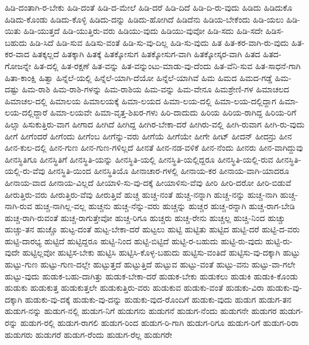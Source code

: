 {ಹಿಡಿ-ದಂತಾಗಿ-ರ-ಬೇಕು
ಹಿಡಿ-ದಂತೆ
ಹಿಡಿ-ದ-ಮೇಲೆ
ಹಿಡಿ-ದರೆ
ಹಿಡಿ-ದಿದೆ
ಹಿಡಿ-ದಿ-ರು-ವುದು
ಹಿಡಿದು
ಹಿಡಿದುಕೊ
ಹಿಡಿದು-ಕೊಂಡು
ಹಿಡಿದು-ಕೊಳ್ಳಿ
ಹಿಡಿದು-ದನ್ನು
ಹಿಡಿದು-ಹೋಗಿದೆ
ಹಿಡಿದೆನು
ಹಿಡಿಯ-ಬೇಕೆಂದು
ಹಿಡಿ-ಯಲು
ಹಿಡಿ-ಯಿತು
ಹಿಡಿ-ಯುತ್ತದೆ
ಹಿಡಿ-ಯುತ್ತಿರು-ವರು
ಹಿಡಿಯು-ವುದು
ಹಿಡಿಯು-ವುವೋ
ಹಿಡಿ-ಸದು
ಹಿಡಿ-ಸದೇ
ಹಿಡಿಸ-ಬಹುದು
ಹಿಡಿ-ಸಿದೆ
ಹಿಡಿ-ಸುವ
ಹಿಡಿಸು-ವಂತೆ
ಹಿಡಿ-ಸು-ವು-ದಿಲ್ಲ
ಹಿಡಿ-ಸು-ವುದು
ಹಿತ
ಹಿತ-ಕರ-ವಾಗಿ-ರು-ವುದು
ಹಿತ-ಕರ-ವಾದ
ಹಿತಕ್ಕಲ್ಲದೆ
ಹಿತಕ್ಕಾಗಿ
ಹಿತಕ್ಕೆ
ಹಿತಕ್ಕೋಸುಗ
ಹಿತಕ್ಕೋಸುಗ-ವಾಗಿ
ಹಿತಕ್ಕೋಸ್ಕರ-ವಾಗಿ
ಹಿತದ
ಹಿತದ-ಗೋಜನ್ನೇ
ಹಿತ-ದಲ್ಲಿ
ಹಿತ-ರಕ್ಷಣೆ
ಹಿತ-ವನ್ನು
ಹಿತ-ವನ್ನುಂಟು-ಮಾಡು-ವು-ದೆಂದು
ಹಿತ-ವೆನಿ-ಸುವ
ಹಿತ-ಸಾಧನೆ-ಗಾಗಿ
ಹಿತಾ-ಕಾಂಕ್ಷಿ
ಹಿತ್ವಾ
ಹಿನ್ನೆಲೆ-ಯಲ್ಲಿ
ಹಿನ್ನೆಲೆ-ಯಾಗಿ-ದೆಯೋ
ಹಿನ್ನೆಲೆ-ಯಾಗಿವೆ
ಹಿಮ
ಹಿಮದ
ಹಿಮದ-ಗಡ್ಡೆ
ಹಿಮ-ದಷ್ಟು
ಹಿಮ-ರಾಶಿ
ಹಿಮ-ರಾಶಿ-ಗಳನ್ನು
ಹಿಮ-ರಾಶಿಯ
ಹಿಮ-ವನ್ನು
ಹಿಮ-ವೇನೂ
ಹಿಮಶ್ರೇಣಿ-ಗಳ
ಹಿಮಾಚಲದ
ಹಿಮಾಚಲ-ದಲ್ಲಿ
ಹಿಮಾಲಯ
ಹಿಮಾಲಯಕ್ಕೆ
ಹಿಮಾ-ಲಯದ
ಹಿಮಾ-ಲಯ-ದಲ್ಲಿ
ಹಿಮಾ-ಲಯ-ದಲ್ಲಿದ್ದಾಗ
ಹಿಮಾ-ಲಯ-ದಲ್ಲಿದ್ದಾರೆ
ಹಿಮಾ-ಲಯವೇ
ಹಿಮಾ-ವೃತ್ತ-ಶಿಖರ-ಗಳು
ಹಿರಿ-ದಾದುದು
ಹಿರಿಯ
ಹಿರಿಯ-ರಾಗಿದ್ದ
ಹಿರಿಯ-ರಿಗೆ
ಹಿಲ್ಸಾ
ಹಿಸುಕುತ್ತಿರು-ವಾಗ
ಹೀಗಾದ
ಹೀಗಿದೆ
ಹೀಗಿದ್ದ
ಹೀಗಿರ-ಬೇಕಾ-ದರೆ
ಹೀಗಿರು-ವಲ್ಲಿ
ಹೀಗಿ-ರುವಾಗ
ಹೀಗಿ-ರು-ವುದು
ಹೀಗೆ
ಹೀಗೆಂದರೆ
ಹೀಗೆಂದು
ಹೀಗೆಂಬ
ಹೀಗೆನ್ನು-ವರು
ಹೀಗೆಯೆ
ಹೀಗೆಯೇ
ಹೀಗೇ
ಹೀಟ್
ಹೀದನ್
ಹೀದನ್ರು
ಹೀನ
ಹೀನ-ಕುಲ-ದಲ್ಲಿ
ಹೀನ-ಗುಣ
ಹೀನ-ಗುಣ-ಗಳಿಲ್ಲದೆ
ಹೀನತೆ
ಹೀನ-ನಡ-ವಳಿಕೆ
ಹೀನ-ನೆಂದು
ಹೀನರು
ಹೀನ-ವಾಗಿದ್ದುವು
ಹೀನಸ್ಥಿತಿಗೂ
ಹೀನಸ್ಥಿತಿಗೆ
ಹೀನಸ್ಥಿತಿ-ಯನ್ನು
ಹೀನಸ್ಥಿತಿ-ಯಲ್ಲಿ
ಹೀನಸ್ಥಿತಿ-ಯಲ್ಲಿದ್ದರೂ
ಹೀನಸ್ಥಿತಿ-ಯಲ್ಲಿ-ರುವ
ಹೀನಸ್ಥಿತಿ-ಯಲ್ಲಿ-ರು-ವೆವು
ಹೀನಸ್ಥಿತಿ-ಯಿಂದ
ಹೀನಸ್ಥಿತಿಯೊ
ಹೀನಾಚಾರ-ಗಳಲ್ಲಿ
ಹೀನಾಯ-ಕರ
ಹೀನಾಯ-ವಾಗಿ-ಯಾದರೂ
ಹೀನಾಯ-ವಾದ
ಹೀನಾಯ-ವಿಲ್ಲದೆ
ಹೀಯಾಳಿ-ಸು-ವು-ದಕ್ಕೆ
ಹೀಯಾಳಿಸು-ವೆವು
ಹೀರಿ
ಹೀರಿ-ದರೋ
ಹೀರಿ-ಬಿಡುವೆ
ಹೀರುತ್ತಿರು-ವರು
ಹೀರುತ್ತಿರು-ವೆವು
ಹೀರುತ್ತಿವೆ
ಹುಚ್ಚ
ಹುಚ್ಚ-ನಂತೆ
ಹುಚ್ಚ-ನನ್ನಾಗಿ
ಹುಚ್ಚ-ನನ್ನು
ಹುಚ್ಚ-ನಾಗಿ
ಹುಚ್ಚ-ನಾಗಿ-ರುವ
ಹುಚ್ಚ-ನಾಗಿಲ್ಲ-ವಲ್ಲ
ಹುಚ್ಚನು
ಹುಚ್ಚ-ನೆನ್ನು-ವರು
ಹುಚ್ಚನ್ನು
ಹುಚ್ಚರ
ಹುಚ್ಚ-ರನ್ನಾಗಿ
ಹುಚ್ಚ-ರಾಗ-ಬೇಡಿ
ಹುಚ್ಚ-ರಾಗಿ-ರುವಂತೆ
ಹುಚ್ಚ-ರಾಗುತ್ತೇವೋ
ಹುಚ್ಚ-ರಿಗೂ
ಹುಚ್ಚರು
ಹುಚ್ಚ-ರೇನು
ಹುಚ್ಚಲ್ಲ
ಹುಚ್ಚಿ-ನಿಂದ
ಹುಚ್ಚು
ಹುಚ್ಚು-ತನ
ಹುಚ್ಚೊ
ಹುಟ್ಟ-ದಂತೆ
ಹುಟ್ಟ-ಬೇಕಾ-ದರೆ
ಹುಟ್ಟಲು
ಹುಟ್ಟಿ
ಹುಟ್ಟಿತು
ಹುಟ್ಟಿದ
ಹುಟ್ಟಿ-ದರೆ
ಹುಟ್ಟಿ-ದ-ವರು
ಹುಟ್ಟಿ-ದಾರಭ್ಯ
ಹುಟ್ಟಿದೆ
ಹುಟ್ಟಿದ್ದರೂ
ಹುಟ್ಟಿ-ನಿಂದ
ಹುಟ್ಟಿ-ಬಿಟ್ಟಿದೆ
ಹುಟ್ಟಿ-ರ-ಬಹುದು
ಹುಟ್ಟಿ-ರು-ವುದು
ಹುಟ್ಟಿ-ರು-ವುದೇ
ಹುಟ್ಟಿಲ್ಲವೋ
ಹುಟ್ಟಿಸ-ಬೇಕು
ಹುಟ್ಟಿಸಿ
ಹುಟ್ಟಿಸಿ-ಕೊಳ್ಳ-ಬಹುದು
ಹುಟ್ಟಿಸು-ವಂತಿದೆ
ಹುಟ್ಟಿಸು-ವು-ದಕ್ಕಾಗಿ
ಹುಟ್ಟು
ಹುಟ್ಟು-ಗುಣ
ಹುಟ್ಟು-ಗುಣ-ದಲ್ಲೇ
ಹುಟ್ಟುತ್ತದೆ
ಹುಟ್ಟುತ್ತಿದೆ
ಹುಟ್ಟುವ
ಹುಟ್ಟು-ವಂತೆ
ಹುಟ್ಟು-ವನು
ಹುಟ್ಟು-ವಾ-ಗಲೇ
ಹುಟ್ಟು-ವುದು
ಹುಡುಕ-ಬಹು-ದಾಗಿತ್ತು
ಹುಡುಕ-ಬೇಕಾ-ದರೆ
ಹುಡುಕ-ಬೇಕು
ಹುಡುಕಲು
ಹುಡುಕಿ
ಹುಡುಕಿ-ಕೊಂಡು
ಹುಡುಕು
ಹುಡುಕುತ್ತ
ಹುಡುಕುತ್ತಲೇ
ಹುಡುಕುತ್ತಿರು-ವರು
ಹುಡುಕುವ
ಹುಡುಕು-ವಂತೆ
ಹುಡುಕು-ವಿರಾ
ಹುಡುಕು-ವು-ದಕ್ಕಾಗಿ
ಹುಡುಕು-ವು-ದಕ್ಕೆ
ಹುಡುಕು-ವು-ದನ್ನು
ಹುಡುಕು-ವುದ-ರೊಂದಿಗೆ
ಹುಡುಕು-ವುದು
ಹುಡುಗ
ಹುಡುಗ-ತನ
ಹುಡುಗ-ನನ್ನು
ಹುಡುಗ-ನಲ್ಲಿ
ಹುಡುಗ-ನಿಗೆ
ಹುಡುಗನು
ಹುಡುಗನೆ
ಹುಡುಗ-ನೆಂದು
ಹುಡುಗನೇ
ಹುಡುಗರ
ಹುಡುಗ-ರನ್ನು
ಹುಡುಗ-ರಲ್ಲಿ
ಹುಡುಗ-ರಾಗಲಿ
ಹುಡುಗ-ರಿಂದ
ಹುಡುಗ-ರಿ-ಗಾಗಿ
ಹುಡುಗ-ರಿಗೂ
ಹುಡುಗ-ರಿಗೆ
ಹುಡುಗ-ರಿರಾ
ಹುಡುಗರು
ಹುಡುಗರೆ
ಹುಡುಗ-ರೆಂದು
ಹುಡುಗ-ರೆಲ್ಲ
ಹುಡುಗರೇ
}
